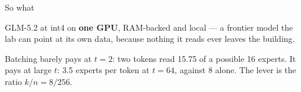 \documentclass[aspectratio=169]{beamer}
\newcommand{\keybox}[1]{%
  \begin{center}
  \colorbox{black!8}{\parbox{0.92\textwidth}{\centering #1}}
  \end{center}}
\newcommand{\goodbox}[1]{%
  \begin{center}
  \colorbox{green!12}{\parbox{0.92\textwidth}{\centering #1}}
  \end{center}}
\begin{document}
\begin{frame}{So what}

\goodbox{\large GLM-5.2 at int4 on \textbf{one GPU}, RAM-backed and local --- a frontier model the lab can point at its own data, because nothing it reads ever leaves the building.}

\vspace{0.9em}
\keybox{Batching barely pays at $t=2$: two tokens read 15.75 of a possible 16 experts. It pays at large $t$: 3.5 experts per token at $t=64$, against 8 alone. The lever is the ratio $k/n=8/256$.}

\end{frame}
\end{document}

